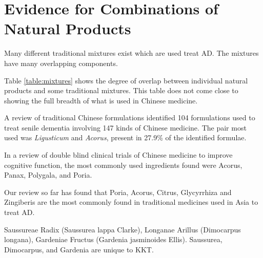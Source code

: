 \section{Evidence for Combinations of Natural Products}

Many different traditional mixtures exist which are used
treat AD. The mixtures have many overlapping components.

Table \ref{table:mixtures} shows the degree of overlap between
individual natural products and some traditional mixtures.
This table does not come close to showing the full breadth of
what is used in Chinese medicine.

A review of traditional Chinese formulations
identified 104 formulations used to treat senile dementia
involving 147 kinds of Chinese medicine.
The pair most used was \textit{Ligusticum} and \textit{Acorus},
present in 27.9\% of the identified formulae.
\cite{zong2014analysis}

In a review of double blind clinical trials of
Chinese medicine to improve cognitive function,
the most commonly used ingredients found were
Acorus,
Panax,
Polygala,
and Poria.

Our review so far has found that
Poria,
Acorus,
Citrus,
Glycyrrhiza and
Zingiberis are the most commonly
found in traditional medicines used in Asia to treat AD.




Saussureae Radix (Saussurea lappa Clarke),
Longanae Arillus (Dimocarpus longana),
Gardeniae Fructus (Gardenia jasminoides Ellis).
Saussurea, Dimocarpus, and Gardenia are unique to KKT.


